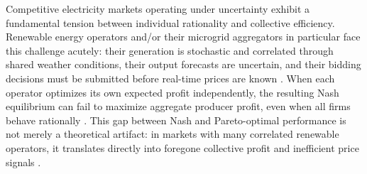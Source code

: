 \documentclass[journal]{IEEEtran}
\begin{document}
Competitive electricity markets operating under uncertainty exhibit a fundamental tension between individual rationality and collective efficiency. Renewable energy operators and/or their microgrid aggregators in particular face this challenge acutely: their generation is stochastic and correlated through shared weather conditions, their output forecasts are uncertain, and their bidding decisions must be submitted before real-time prices are known \cite{dvorkin2020chance, wong2007pricing, mieth2020distribution, 7930435}. When each operator optimizes its own expected profit independently, the resulting Nash equilibrium can fail to maximize aggregate producer profit,
even when all firms behave rationally \cite{zhang2016competition, lee2015rational, HobbsPang2007}.
This gap between Nash and Pareto-optimal performance is not merely a theoretical artifact: in markets with many correlated renewable operators, it translates directly into foregone collective profit and inefficient price signals \cite{asplund2002risk, wambach1999bertrand}.
\end{document}
